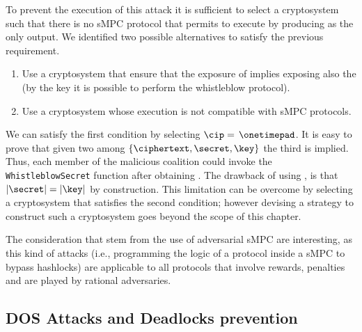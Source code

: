 To prevent the execution of this attack it is sufficient to select a cryptosystem \cipvocabulary such that there is no sMPC protocol that permits to execute \dec by producing \secret as the only output.
We identified two possible alternatives to satisfy the previous requirement.

\begin{enumerate}
	\item Use a cryptosystem that ensure that the exposure of \secret implies exposing also the \key (by the key it is possible to perform the whistleblow protocol).
	\item Use a cryptosystem whose execution is not compatible with sMPC protocols.
\end{enumerate}

We can satisfy the first condition by selecting $ \mathcal{\cip}=$$ \text{ }\onetimepad$. 
It is easy to prove that given two among $\{ \ciphertext , \secret , \key \}$ the third is implied. 
Thus, each member of the malicious coalition could invoke the \texttt{WhistleblowSecret} function after obtaining \secret. 
The drawback of using \onetimepad, is that $|\secret| = |\key|$ by construction. 
This limitation can be overcome by selecting a cryptosystem that satisfies the second condition; however devising a strategy to construct such a cryptosystem goes beyond the scope of this chapter.

The consideration that stem from the use of adversarial sMPC are interesting, as this kind of attacks (i.e., programming the logic of a protocol inside a sMPC to bypass hashlocks) are applicable to all protocols that involve rewards, penalties and are played by rational adversaries.

\subsection{DOS Attacks and Deadlocks prevention}

